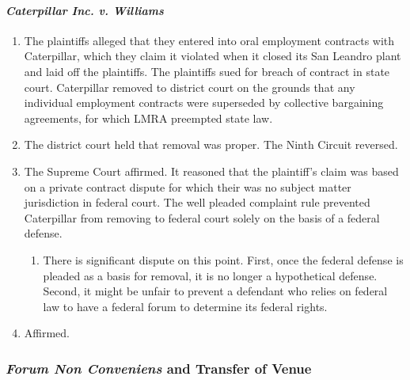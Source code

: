 \paragraph{\emph{Caterpillar Inc. v. Williams}}

\begin{enumerate}
    \item The plaintiffs alleged that they entered into oral employment contracts with Caterpillar, which they claim it violated when it closed its San Leandro plant and laid off the plaintiffs. The plaintiffs sued for breach of contract in state court. Caterpillar removed to district court on the grounds that any individual employment contracts were superseded by collective bargaining agreements, for which LMRA preempted state law.
    \item The district court held that removal was proper. The Ninth Circuit reversed.
    \item The Supreme Court affirmed. It reasoned that the plaintiff's claim was based on a private contract dispute for which their was no subject matter jurisdiction in federal court. The well pleaded complaint rule prevented Caterpillar from removing to federal court solely on the basis of a federal defense.
    \begin{enumerate}
        \item There is significant dispute on this point. First, once the federal defense is pleaded as a basis for removal, it is no longer a hypothetical defense. Second, it might be unfair to prevent a defendant who relies on federal law to have a federal forum to determine its federal rights.
    \end{enumerate}
    \item Affirmed.
\end{enumerate}

\subsubsection{\emph{Forum Non Conveniens} and Transfer of Venue}

